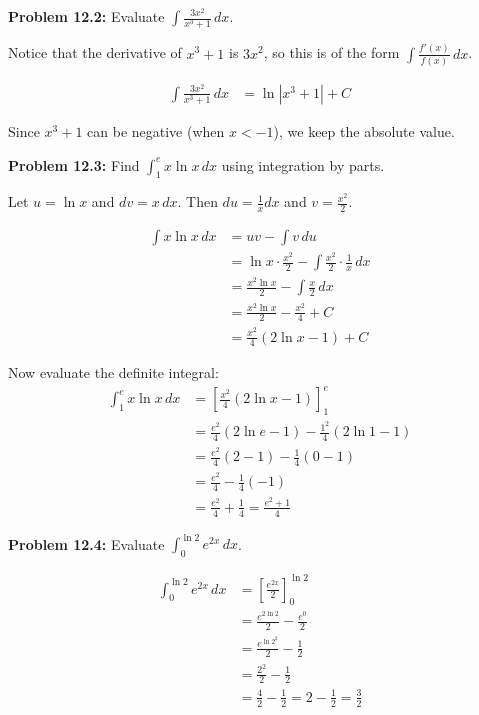 \documentclass[12pt,a4paper]{book}
\theoremstyle{definition}
\begin{document}
\begin{solution}
\textbf{Problem 12.2:} Evaluate $\int \frac{3x^2}{x^3 + 1} \, dx$.

Notice that the derivative of $x^3 + 1$ is $3x^2$, so this is of the form $\int \frac{f'(x)}{f(x)} \, dx$.

\begin{align}
\int \frac{3x^2}{x^3 + 1} \, dx &= \ln|x^3 + 1| + C
\end{align}

Since $x^3 + 1$ can be negative (when $x < -1$), we keep the absolute value.
\end{solution}

\begin{solution}
\textbf{Problem 12.3:} Find $\int_1^e x \ln x \, dx$ using integration by parts.

Let $u = \ln x$ and $dv = x \, dx$.
Then $du = \frac{1}{x} dx$ and $v = \frac{x^2}{2}$.

\begin{align}
\int x \ln x \, dx &= uv - \int v \, du\\
&= \ln x \cdot \frac{x^2}{2} - \int \frac{x^2}{2} \cdot \frac{1}{x} \, dx\\
&= \frac{x^2 \ln x}{2} - \int \frac{x}{2} \, dx\\
&= \frac{x^2 \ln x}{2} - \frac{x^2}{4} + C\\
&= \frac{x^2}{4}(2\ln x - 1) + C
\end{align}

Now evaluate the definite integral:
\begin{align}
\int_1^e x \ln x \, dx &= \left[ \frac{x^2}{4}(2\ln x - 1) \right]_1^e\\
&= \frac{e^2}{4}(2\ln e - 1) - \frac{1^2}{4}(2\ln 1 - 1)\\
&= \frac{e^2}{4}(2 - 1) - \frac{1}{4}(0 - 1)\\
&= \frac{e^2}{4} - \frac{1}{4}(-1)\\
&= \frac{e^2}{4} + \frac{1}{4} = \frac{e^2 + 1}{4}
\end{align}
\end{solution}

\begin{solution}
\textbf{Problem 12.4:} Evaluate $\int_0^{\ln 2} e^{2x} \, dx$.

\begin{align}
\int_0^{\ln 2} e^{2x} \, dx &= \left[ \frac{e^{2x}}{2} \right]_0^{\ln 2}\\
&= \frac{e^{2\ln 2}}{2} - \frac{e^0}{2}\\
&= \frac{e^{\ln 2^2}}{2} - \frac{1}{2}\\
&= \frac{2^2}{2} - \frac{1}{2}\\
&= \frac{4}{2} - \frac{1}{2} = 2 - \frac{1}{2} = \frac{3}{2}
\end{align}
\end{solution}
\end{document}
